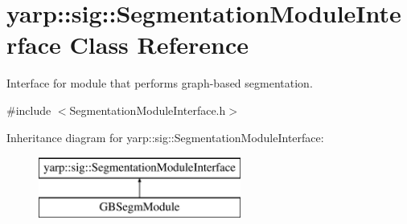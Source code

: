 \section{yarp\+::sig\+::Segmentation\+Module\+Interface Class Reference}
\label{classyarp_1_1sig_1_1SegmentationModuleInterface}


Interface for module that performs graph-\/based segmentation.  




{\ttfamily \#include $<$Segmentation\+Module\+Interface.\+h$>$}

Inheritance diagram for yarp\+::sig\+::Segmentation\+Module\+Interface\+:\begin{figure}[H]
\begin{center}
\leavevmode
\includegraphics[height=2.000000cm]{classyarp_1_1sig_1_1SegmentationModuleInterface}
\end{center}
\end{figure}
